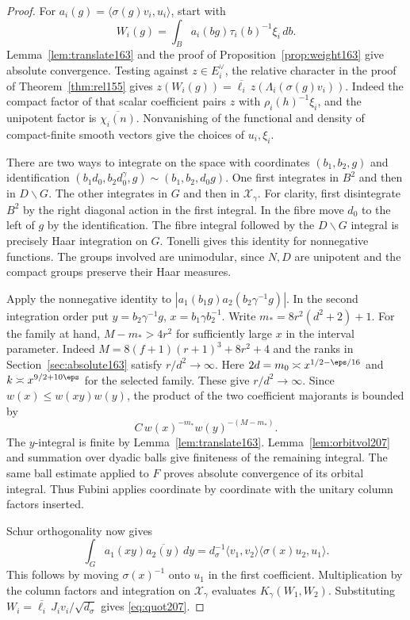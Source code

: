 \documentclass[a4paper,11pt]{article}
\theoremstyle{definition}
\theoremstyle{remark}
\numberwithin{equation}{section}
\begin{document}
\begin{proof}
For \(a_i(g)=\langle\sigma(g)v_i,u_i\rangle\), start with
\[
        W_i(g)=\int_B a_i(bg)\tau_i(b)^{-1}\xi_i\,db.
\]
Lemma~\ref{lem:translate163} and the proof of
Proposition~\ref{prop:weight163} give absolute convergence.
Testing against \(z\in E_i^\vee\), the relative character in the
proof of Theorem~\ref{thm:rel155} gives
\(z(W_i(g))=\overline{\ell_i}\,z(\Lambda_i(\sigma(g)v_i))\).
Indeed the compact factor of that scalar coefficient pairs \(z\)
with \(\rho_i(h)^{-1}\xi_i\), and the unipotent factor is
\(\overline{\chi_i(n)}\). Nonvanishing of the functional and density
of compact-finite smooth vectors give the choices of \(u_i,\xi_i\).

There are two ways to integrate on the space with coordinates
\((b_1,b_2,g)\) and identification
\((b_1d_0,b_2d_0^\gamma,g)\sim(b_1,b_2,d_0g)\).
One first integrates in \(B^2\) and then in \(D\backslash G\).
The other integrates in \(G\) and then in \(\mathcal X_\gamma\).
For clarity, first disintegrate \(B^2\) by the right diagonal
action in the first integral. In the fibre move \(d_0\) to
the left of \(g\) by the identification. The fibre integral
followed by the \(D\backslash G\) integral is precisely Haar
integration on \(G\). Tonelli gives this identity for nonnegative
functions. The groups involved are unimodular, since \(N,D\)
are unipotent and the compact groups preserve their Haar measures.

Apply the nonnegative identity to
\(|a_1(b_1g)a_2(b_2\gamma^{-1}g)|\). In the second integration
order put \(y=b_2\gamma^{-1}g\), \(x=b_1\gamma b_2^{-1}\).
Write \(m_*=8r^2(d^2+2)+1\). For the family at hand,
\(M-m_*>4r^2\) for sufficiently large \(x\) in the interval
parameter. Indeed \(M=8(f+1)(r+1)^3+8r^2+4\) and the ranks
in Section~\ref{sec:absolute163} satisfy \(r/d^2\to\infty\).
Here \(2d=m_0\asymp x^{1/2-\eps/16}\) and \(k\asymp x^{9/2+10\eps}\) for the selected family. These give \(r/d^2\to\infty\).
Since \(w(x)\le w(xy)w(y)\), the product of the two coefficient
majorants is bounded by
\[
                C\,w(x)^{-m_*}w(y)^{-(M-m_*)}.
\]
The \(y\)-integral is finite by Lemma~\ref{lem:translate163}.
Lemma~\ref{lem:orbitvol207} and summation over dyadic balls give
finiteness of the remaining integral. The same ball estimate
applied to \(F\) proves absolute convergence of its orbital
integral. Thus Fubini applies coordinate by coordinate with the
unitary column factors inserted.

Schur orthogonality now gives
\[
 \int_G a_1(xy)\overline{a_2(y)}\,dy
   =d_\sigma^{-1}\langle v_1,v_2\rangle
                    \langle\sigma(x)u_2,u_1\rangle .
\]
This follows by moving \(\sigma(x)^{-1}\) onto \(u_1\) in the
first coefficient. Multiplication by the column factors and
integration on \(\mathcal X_\gamma\) evaluates \(K_\gamma(W_1,W_2)\).
Substituting \(W_i=\overline{\ell_i}\,J_i v_i/\sqrt{d_\sigma}\)
gives \eqref{eq:quot207}.
\end{proof}
\end{document}
